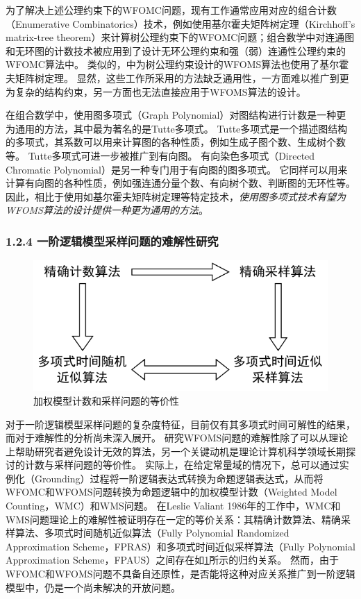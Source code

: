 \documentclass[12pt,UTF8,AutoFakeBold=3,a4paper]{ctexart} %
\begin{document}
为了解决上述公理约束下的WFOMC问题，现有工作通常应用对应的组合计数（Enumerative Combinatorics）技术，例如使用基尔霍夫矩阵树定理（Kirchhoff's matrix-tree theorem）来计算树公理约束下的WFOMC问题；组合数学中对连通图和无环图的计数技术被应用到了设计无环公理约束和强（弱）连通性公理约束的WFOMC算法中。
类似的，中为树公理约束设计的WFOMS算法也使用了基尔霍夫矩阵树定理。
显然，这些工作所采用的方法缺乏通用性，一方面难以推广到更为复杂的结构约束，另一方面也无法直接应用于WFOMS算法的设计。

在组合数学中，使用图多项式（Graph Polynomial）对图结构进行计数是一种更为通用的方法，其中最为著名的是Tutte多项式。
Tutte多项式是一个描述图结构的多项式，其系数可以用来计算图的各种性质，例如生成子图个数、生成树个数等。
Tutte多项式可进一步被推广到有向图。
有向染色多项式（Directed Chromatic Polynomial）是另一种专门用于有向图的图多项式。
它同样可以用来计算有向图的各种性质，例如强连通分量个数、有向树个数、判断图的无环性等。
因此，相比于使用如基尔霍夫矩阵树定理等特定技术，\emph{使用图多项式技术有望为WFOMS算法的设计提供一种更为通用的方法}。

\subsubsection{1.2.4 一阶逻辑模型采样问题的难解性研究}

\begin{figure}[b]
	\centering
	\includegraphics[width=.5\textwidth]{figs/counting_sampling_rel.pdf}
	\caption{加权模型计数和采样问题的等价性}
	\label{fig:counting_sampling_equivalence}
 \end{figure}

对于一阶逻辑模型采样问题的复杂度特征，目前仅有其多项式时间可解性的结果，而对于难解性的分析尚未深入展开。
研究WFOMS问题的难解性除了可以从理论上帮助研究者避免设计无效的算法，另一个关键动机是理论计算机科学领域长期探讨的计数与采样问题的等价性。
 实际上，在给定常量域的情况下，总可以通过实例化（Grounding）过程将一阶逻辑表达式转换为命题逻辑表达式，从而将WFOMC和WFOMS问题转换为命题逻辑中的加权模型计数（Weighted Model Counting，WMC）和WMS问题。
在Leslie Valiant 1986年的工作\cite{jerrum_random_1986}中，WMC和WMS问题理论上的难解性被证明存在一定的等价关系：其精确计数算法、精确采样算法、多项式时间随机近似算法（Fully Polynomial Randomized Approximation Scheme，FPRAS）和多项式时间近似采样算法（Fully Polynomial Approximation Scheme，FPAUS）之间存在如\cref{fig:counting_sampling_equivalence}所示的归约关系。
然而，由于WFOMC和WFOMS问题不具备自还原性，是否能将这种对应关系推广到一阶逻辑模型中，仍是一个尚未解决的开放问题。
\end{document}
